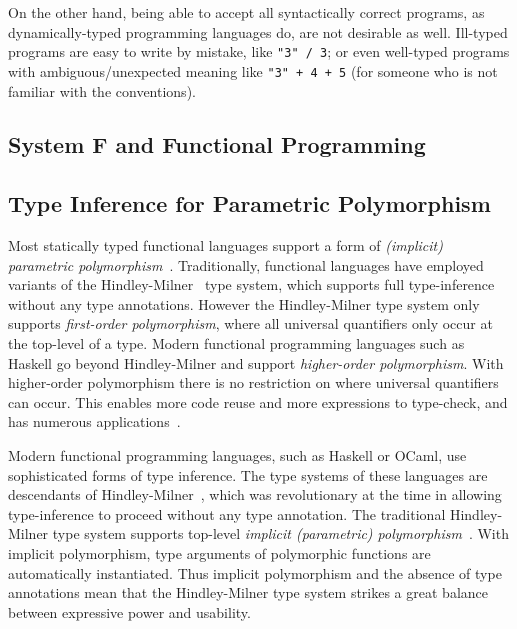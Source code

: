 On the other hand, being able to accept all syntactically correct programs,
as dynamically-typed programming languages do,
are not desirable as well.
Ill-typed programs are easy to write by mistake, like \verb|"3" / 3|;
or even well-typed programs with ambiguous/unexpected meaning like \verb|"3" + 4 + 5|
(for someone who is not familiar with the conventions).



\subsection{System F and Functional Programming}


\subsection{Type Inference for Parametric Polymorphism}


Most statically typed functional languages support a form of
\emph{(implicit) parametric polymorphism}~\cite{reynolds1983types}.
Traditionally, functional languages have employed variants of the
Hindley-Milner~\cite{hindley1969principal,milner1978theory,damas1982principal}
type system, which supports full type-inference without any type annotations.
However the Hindley-Milner type system only supports \emph{first-order
polymorphism}, where all universal quantifiers only occur at the top-level
of a type.  Modern functional programming languages such as Haskell go beyond
Hindley-Milner and support \emph{higher-order polymorphism}. With higher-order
polymorphism there is no restriction on where universal quantifiers can occur.
This enables more code reuse and more expressions to type-check, and has
numerous applications~\cite{jones1995functional,gill1993short,launchbury1995state,lammel2003scrap}.


Modern functional programming languages, such as Haskell or OCaml,
use sophisticated forms of type inference. The type systems of these languages are
descendants of
Hindley-Milner~\cite{hindley1969principal,milner1978theory,damas1982principal}, 
which was revolutionary at the
time in allowing type-inference to proceed without any type
annotation. The traditional Hindley-Milner type system supports
top-level \emph{implicit (parametric) polymorphism}~\cite{reynolds1983types}. With implicit
polymorphism, type arguments of polymorphic functions are
automatically instantiated. Thus implicit polymorphism and the absence of
type annotations mean that the Hindley-Milner type system 
strikes a great balance between expressive power and usability. 



